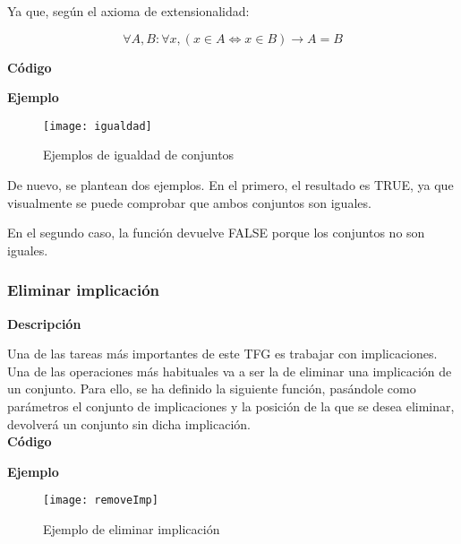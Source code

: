    Ya que, seg\'un el axioma de extensionalidad:

    \[
        \forall A, B : \forall x, (x \in A \Leftrightarrow x \in B) \to A = B
    \]


    \textbf{C\'odigo}

    
    \bigskip

    \textbf{Ejemplo}

    \begin{figure}[H]
        \centering
        \texttt{[image: igualdad]}
        \caption{Ejemplos de igualdad de conjuntos}
        \label{fig:igualdad}
    \end{figure}

    De nuevo, se plantean dos ejemplos. En el primero, el resultado es TRUE, ya que visualmente se puede comprobar que ambos conjuntos son 
    iguales.

    En el segundo caso, la funci\'on devuelve FALSE porque los conjuntos no son iguales.






\subsubsection{Eliminar implicaci\'on}

    \textbf{Descripci\'on}

    Una de las tareas m\'as importantes de este TFG es trabajar con implicaciones. Una de las operaciones m\'as habituales 
    va a ser la de eliminar una implicaci\'on de un conjunto. Para ello, se ha definido la siguiente funci\'on, pas\'andole 
    como par\'ametros el conjunto de implicaciones y la posici\'on de la que se desea eliminar, devolver\'a un conjunto sin 
    dicha implicaci\'on.
    \\


    \textbf{C\'odigo}

    
    \bigskip

    \textbf{Ejemplo}

    \begin{figure}[H]
        \centering
        \texttt{[image: removeImp]}
        \caption{Ejemplo de eliminar implicaci\'on}
        \label{fig:removeImp}
    \end{figure}


